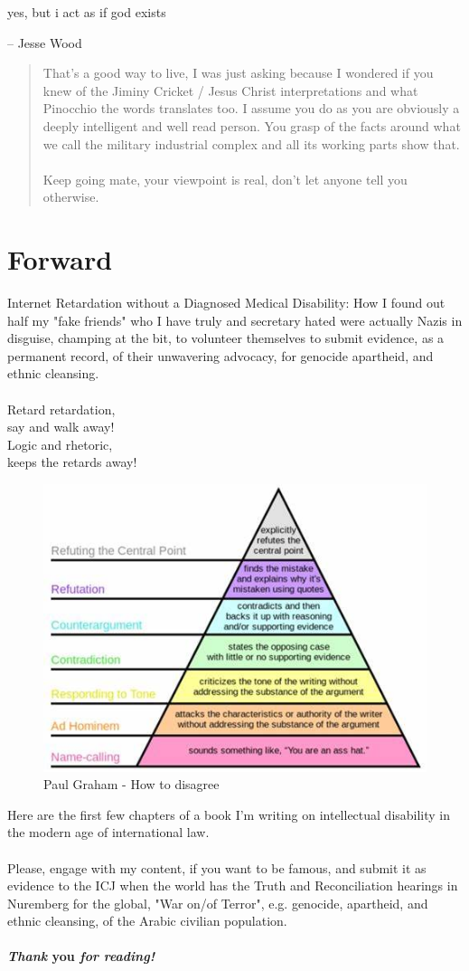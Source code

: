 \documentclass[16pt,openany,oneside]{book}
\begin{document}
\epigraph{
 yes, but i act as if god exists
}{-- Jesse Wood}

\begin{quote}
    That's a good way to live, I was just asking because I wondered if you knew of the Jiminy Cricket / Jesus Christ interpretations and what Pinocchio the words translates too. I assume you do as you are obviously a deeply intelligent and well read person. You grasp of the facts around what we call the military industrial complex and all its working parts show that.
    \\\\
    Keep going mate, your viewpoint is real, don't let anyone tell you otherwise.
\end{quote}

\chapter*{Forward} 

Internet Retardation without a Diagnosed Medical Disability: How I found out half my "fake friends" who I have truly and secretary hated were actually Nazis in disguise, champing at the bit, to volunteer themselves to submit evidence, as a permanent record, of their unwavering advocacy, for genocide apartheid, and ethnic cleansing.
\\\\
Retard retardation, \\ 
say and walk away! \\ 
Logic and rhetoric, \\ 
keeps the retards away!

\begin{figure}[H]
    \centering
    \includegraphics[width=0.5\linewidth]{assets/diagree.jpg}
    \caption{Paul Graham - How to disagree \cite{graham2008disagree}}
    \label{fig:enter-label}
\end{figure}

Here are the first few chapters of a book I'm writing on intellectual disability in the modern age of international law.
\\\\
Please, engage with my content, if you want to be famous, and submit it as evidence to the ICJ when the world has the Truth and Reconciliation hearings in Nuremberg for the global, "War on/of Terror", e.g. genocide, apartheid, and ethnic cleansing, of the Arabic civilian population.
\\\\
\textbf{\textit{Thank} you \textit{for reading!}}
\end{document}
